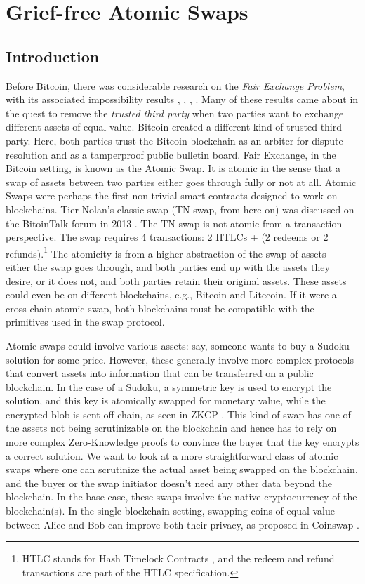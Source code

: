 \chapter{Grief-free Atomic Swaps}  %
\label{chapter:swaps}

\section{Introduction}
Before Bitcoin, there was considerable research on the \textit{Fair Exchange Problem}, with its associated impossibility results \cite{cleve1986limits}, \cite{fair_exchange_impossibility}, \cite{franklin1997fair}, \cite{asokan1998optimistic}. Many of these results came about in the quest to remove the \textit{trusted third party} when two parties want to exchange different assets of equal value. Bitcoin created a different kind of trusted third party. Here, both parties trust the Bitcoin blockchain as an arbiter for dispute resolution and as a tamperproof public bulletin board. Fair Exchange, in the Bitcoin setting, is known as the Atomic Swap. It is atomic in the sense that a swap of assets between two parties either goes through fully or not at all. Atomic Swaps were perhaps the first non-trivial smart contracts designed to work on blockchains. Tier Nolan's classic swap (TN-swap, from here on) was discussed on the BitoinTalk forum in 2013 \cite{atomic_swap}. The TN-swap is not atomic from a transaction perspective. The swap requires 4 transactions: 2 HTLCs + (2 redeems or 2 refunds).\footnote{HTLC stands for Hash Timelock Contracts \cite{htlcs_considered_harmful}, and the redeem and refund transactions are part of the HTLC specification.} The atomicity is from a higher abstraction of the swap of assets -- either the swap goes through, and both parties end up with the assets they desire, or it does not, and both parties retain their original assets. These assets could even be on different blockchains, e.g., Bitcoin and Litecoin. If it were a cross-chain atomic swap, both blockchains must be compatible with the primitives used in the swap protocol. 

Atomic swaps could involve various assets: say, someone wants to buy a Sudoku solution for some price. However, these generally involve more complex protocols that convert assets into information that can be transferred on a public blockchain. In the case of a Sudoku, a symmetric key is used to encrypt the solution, and this key is atomically swapped for monetary value, while the encrypted blob is sent off-chain, as seen in ZKCP \cite{maxwell2016zero}. This kind of swap has one of the assets not being scrutinizable on the blockchain and hence has to rely on more complex Zero-Knowledge proofs to convince the buyer that the key encrypts a correct solution. We want to look at a more straightforward class of atomic swaps where one can scrutinize the actual asset being swapped on the blockchain, and the buyer or the swap initiator doesn't need any other data beyond the blockchain. In the base case, these swaps involve the native cryptocurrency of the blockchain(s). In the single blockchain setting, swapping coins of equal value between Alice and Bob can improve both their privacy, as proposed in Coinswap \cite{coinswap}.

